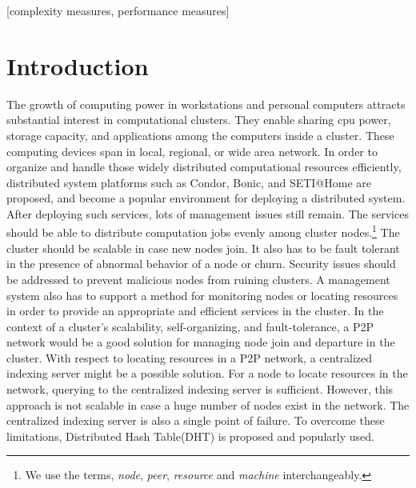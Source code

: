 \documentclass{acm_proc_article-sp}
\begin{document}
[complexity measures, performance measures]



\section{Introduction}
The growth of computing power in workstations and personal computers attracts substantial interest in computational clusters\cite{bonic}\cite{condor}\cite{setiathome}. They enable sharing cpu power, storage capacity, and applications among the computers inside a cluster. These computing devices span in local, regional, or wide area network.
In order to organize and handle those widely distributed computational resources efficiently, distributed system platforms such as Condor\cite{condor}, Bonic\cite{bonic}, and SETI@Home\cite{setiathome} are proposed, 
and become a popular environment for deploying a distributed system.
After deploying such services, lots of management issues still remain. The services should be able to distribute computation jobs evenly among cluster nodes.\footnote{We use the terms, \textit{node}, \textit{peer}, \textit{resource} and \textit{machine} interchangeably.}
The cluster should be scalable in case new nodes join. It also has to be fault tolerant in the presence of abnormal behavior of a node or churn. 
Security issues should be addressed to prevent malicious nodes from ruining clusters.
A management system also has to support a method for monitoring nodes or locating resources in order to provide an appropriate and efficient services in the cluster.
In the context of a cluster's scalability, self-organizing, and fault-tolerance, a P2P network\cite{chord}\cite{pastry}\cite{can}\cite{bamboo} would be a good solution for managing node join and departure in the cluster. 
With respect to locating resources in a P2P network, a centralized indexing server might be a possible solution. 
For a node to locate resources in the network, querying to the centralized indexing server is sufficient. However, this approach is not scalable in case a huge number of nodes exist in the network.
The centralized indexing server is also a single point of failure. To overcome these limitations, Distributed Hash Table(DHT) is proposed and popularly used.
\end{document}
